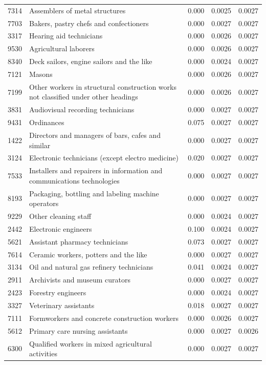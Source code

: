 \begin{longtable}{p{}>{\raggedright\arraybackslash}p{}rrr}
7314 & Assemblers of metal structures & 0.000 & 0.0025 & 0.0027 \\
7703 & Bakers, pastry chefs and confectioners & 0.000 & 0.0027 & 0.0027 \\
3317 & Hearing aid technicians & 0.000 & 0.0026 & 0.0027 \\
9530 & Agricultural laborers & 0.000 & 0.0026 & 0.0027 \\
8340 & Deck sailors, engine sailors and the like & 0.000 & 0.0024 & 0.0027 \\
7121 & Masons & 0.000 & 0.0026 & 0.0027 \\
7199 & Other workers in structural construction works not classified under other headings & 0.000 & 0.0026 & 0.0027 \\
3831 & Audiovisual recording technicians & 0.000 & 0.0027 & 0.0027 \\
9431 & Ordinances & 0.075 & 0.0027 & 0.0027 \\
1422 & Directors and managers of bars, cafes and similar & 0.000 & 0.0027 & 0.0027 \\
3124 & Electronic technicians (except electro medicine) & 0.020 & 0.0027 & 0.0027 \\
7533 & Installers and repairers in information and communications technologies & 0.000 & 0.0027 & 0.0027 \\
8193 & Packaging, bottling and labeling machine operators & 0.000 & 0.0027 & 0.0027 \\
9229 & Other cleaning staff & 0.000 & 0.0024 & 0.0027 \\
2442 & Electronic engineers & 0.100 & 0.0024 & 0.0027 \\
5621 & Assistant pharmacy technicians & 0.073 & 0.0027 & 0.0027 \\
7614 & Ceramic workers, potters and the like & 0.000 & 0.0027 & 0.0027 \\
3134 & Oil and natural gas refinery technicians & 0.041 & 0.0024 & 0.0027 \\
2911 & Archivists and museum curators & 0.000 & 0.0027 & 0.0027 \\
2423 & Forestry engineers & 0.000 & 0.0024 & 0.0027 \\
3327 & Veterinary assistants & 0.018 & 0.0027 & 0.0027 \\
7111 & Formworkers and concrete construction workers & 0.000 & 0.0026 & 0.0027 \\
5612 & Primary care nursing assistants & 0.000 & 0.0027 & 0.0026 \\
6300 & Qualified workers in mixed agricultural activities & 0.000 & 0.0027 & 0.0027 \\

\end{longtable}
